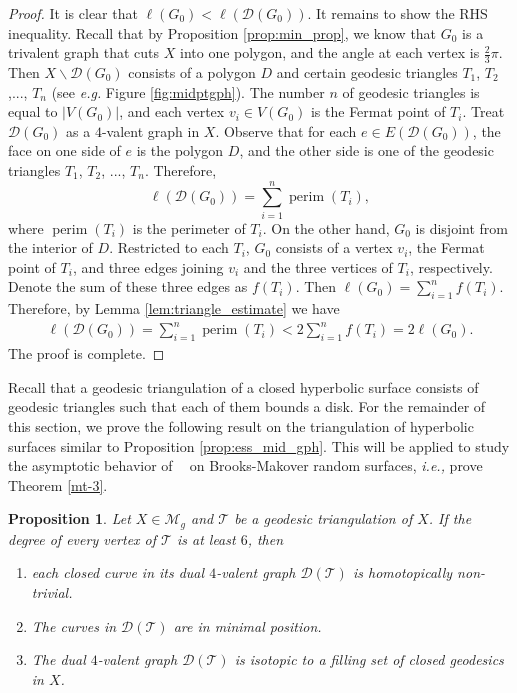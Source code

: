 \documentclass[UTF8]{amsart}
\newtheorem{proposition}[theorem]{Proposition}
\numberwithin{equation}{section}
\theoremstyle{definition}
\theoremstyle{example}
\theoremstyle{remark}
\DeclareMathOperator{\perim}{perim}
\DeclareMathOperator{\slfs}{\mathcal{L}_{sys}^{fill}}
\begin{document}
\begin{proof}
	It is clear that $\ell(G_0)<\ell(\mathcal{D}(G_0))$. It remains to show the RHS inequality.
	Recall that by Proposition \ref{prop:min_prop}, we know that $G_0$ is a trivalent graph that cuts $X$ into one polygon, and the angle at each vertex is $ \frac{2}{3}\pi$. Then $X \backslash \mathcal{D}(G_0)$ consists of a polygon $D$ and certain geodesic triangles $T_1$, $T_2$,..., $T_n$ (see \emph{e.g.} Figure \ref{fig:midptgph}). The number $n$ of geodesic triangles is equal to $|V(G_0)|$, and each vertex $v_i \in V(G_0)$ is the Fermat point of $T_i$. Treat $\mathcal{D}(G_0)$ as a $4$-valent graph in $X$. Observe that for each $e \in E(\mathcal{D}(G_0))$, the face on one side of $e$ is the polygon $D$, and the other side is one of the geodesic triangles  $T_1$, $T_2$, ..., $T_n$. Therefore, $$\ell(\mathcal{D}(G_0)) = \sum_{i=1}^n \perim(T_i),$$ where $\perim(T_i)$ is the perimeter of $T_i$. On the other hand, $G_0$ is disjoint from the interior of $D$. Restricted to each $T_i$, $G_0$ consists of a vertex $v_i$, the Fermat point of $T_i$, and three edges joining $v_i$ and the three vertices of $T_i$, respectively. Denote the sum of these three edges as $f(T_i)$. Then $\ell(G_0) = \sum_{i=1}^n f(T_i)$. Therefore, by Lemma \ref{lem:triangle_estimate} we have
	\begin{eqnarray*}
		\ell(\mathcal{D}(G_0)) = \sum_{i=1}^n \perim(T_i) < 2 \sum_{i=1}^n f(T_i) = 2\ell(G_0).
	\end{eqnarray*}
	The proof is complete. 
\end{proof}




Recall that a geodesic triangulation of a closed hyperbolic surface consists of geodesic triangles such that each of them bounds a disk. For the remainder of this section, we prove the following result on the triangulation of hyperbolic surfaces similar to Proposition \ref{prop:ess_mid_gph}. This will be applied to study the asymptotic behavior of $\slfs$ on Brooks-Makover random surfaces, \emph{i.e.,}  prove Theorem \ref{mt-3}.
\begin{proposition}
	Let $X \in \mathcal{M}_g$ and $\mathcal{T}$ be a geodesic triangulation of $X$. If the degree of every vertex of $\mathcal{T}$ is at least $6$, then 
    \begin{enumerate}
        \item each closed curve in its dual $4$-valent graph  $\mathcal{D}(\mathcal{T})$ is homotopically non-trivial.
        \item The curves in $\mathcal{D}(\mathcal{T})$ are in minimal position. 
        \item The dual $4$-valent graph $\mathcal{D}(\mathcal{T})$ is isotopic to a filling set of closed geodesics in $X$. 
    \end{enumerate}
	\label{prop:ess_tri_mid_gph}
\end{proposition}
\end{document}
